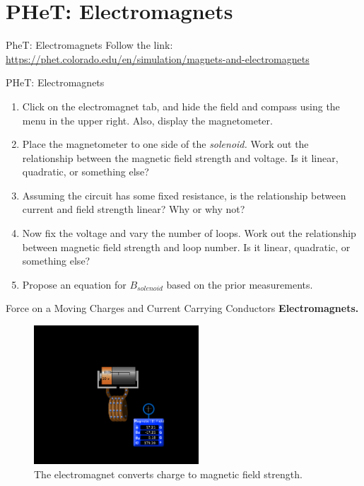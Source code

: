 \documentclass{beamer}
\begin{document}
\section{PHeT: Electromagnets}

\begin{frame}{PheT: Electromagnets}
Follow the link: \\ \vspace{0.5cm}
\url{https://phet.colorado.edu/en/simulation/magnets-and-electromagnets}
\end{frame}

\begin{frame}{PHeT: Electromagnets}
\small
\begin{enumerate}
\item Click on the electromagnet tab, and hide the field and compass using the menu in the upper right.  Also, display the magnetometer.
\item Place the magnetometer to one side of the \textit{solenoid.}  Work out the relationship between the magnetic field strength and voltage.  Is it linear, quadratic, or something else?
\item Assuming the circuit has some fixed resistance, is the relationship between current and field strength linear?  Why or why not?
\item Now fix the voltage and vary the number of loops.  Work out the relationship between magnetic field strength and loop number.  Is it linear, quadratic, or something else?
\item Propose an equation for $B_{solenoid}$ based on the prior measurements.
\end{enumerate}
\end{frame}

\begin{frame}{Force on a Moving Charges and Current Carrying Conductors}
\textbf{Electromagnets.}
\begin{figure}
\centering
\includegraphics[width=0.55\textwidth]{figures/phetemmag.png}
\caption{\label{fig:phetemmag} The electromagnet converts charge to magnetic field strength.}
\end{figure}
\end{frame}
\end{document}
